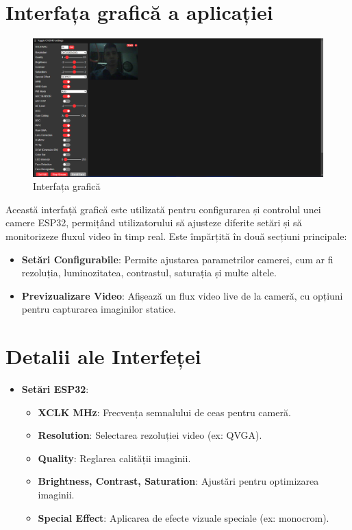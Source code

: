 \documentclass[a4paper,12pt]{report}
\begin{document}
\section{Interfața grafică a aplicației}
\begin{figure}[H]
    \centering
    \includegraphics[width=1.0\linewidth]{interfata grafica.png}
    \caption{Interfața grafică}
    \label{fig:enter-label}
\end{figure}
Această interfață grafică este utilizată pentru configurarea și controlul unei camere ESP32, permițând utilizatorului să ajusteze diferite setări și să monitorizeze fluxul video în timp real. Este împărțită în două secțiuni principale:

\begin{itemize}
    \item \textbf{Setări Configurabile}: Permite ajustarea parametrilor camerei, cum ar fi rezoluția, luminozitatea, contrastul, saturația și multe altele.
    \item \textbf{Previzualizare Video}: Afișează un flux video live de la cameră, cu opțiuni pentru capturarea imaginilor statice.
\end{itemize}

\section{Detalii ale Interfeței}
\begin{itemize}
    \item \textbf{Setări ESP32}:
    \begin{itemize}
        \item \textbf{XCLK MHz}: Frecvența semnalului de ceas pentru cameră.
        \item \textbf{Resolution}: Selectarea rezoluției video (ex: QVGA).
        \item \textbf{Quality}: Reglarea calității imaginii.
        \item \textbf{Brightness, Contrast, Saturation}: Ajustări pentru optimizarea imaginii.
        \item \textbf{Special Effect}: Aplicarea de efecte vizuale speciale (ex: monocrom).
        
    \end{itemize}

\end{itemize}
\end{document}
